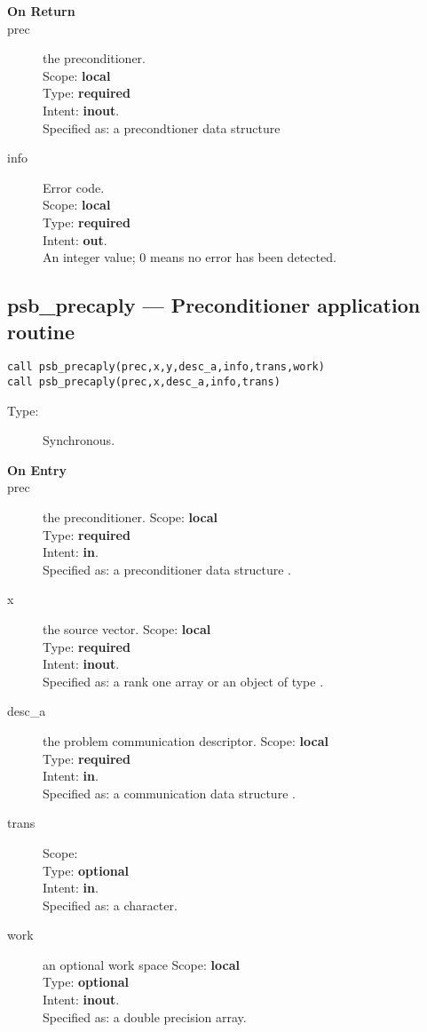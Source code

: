 \begin{description}
\item[\bf On Return]
\item[prec] the preconditioner.\\
Scope: {\bf local} \\
Type: {\bf required}\\
Intent: {\bf inout}.\\
Specified as: a precondtioner data structure \precdata\\
\item[info] Error code.\\
Scope: {\bf local} \\
Type: {\bf required} \\
Intent: {\bf out}.\\
An integer value; 0 means no error has been detected. 
\end{description}



\clearpage\subsection*{psb\_precaply --- Preconditioner application routine}

\begin{verbatim}
call psb_precaply(prec,x,y,desc_a,info,trans,work)
call psb_precaply(prec,x,desc_a,info,trans)
\end{verbatim}

\begin{description}
\item[Type:] Synchronous.
\item[\bf On Entry]
\item[prec] the preconditioner.
Scope: {\bf local} \\
Type: {\bf required}\\
Intent: {\bf in}.\\
Specified as: a preconditioner data structure \precdata.
\item[x] the source vector.
Scope: {\bf local} \\
Type: {\bf required}\\
Intent: {\bf inout}.\\
Specified as:  a rank one array or an object of type \vdata. 
\item[desc\_a] the problem communication descriptor.
Scope: {\bf local} \\
Type: {\bf required}\\
Intent: {\bf in}.\\
Specified as: a communication data structure \descdata.
\item[trans] 
Scope: {\bf } \\
Type: {\bf optional}\\
Intent: {\bf in}.\\
Specified as: a character.
\item[work] an optional work space
Scope: {\bf local} \\
Type: {\bf optional}\\
Intent: {\bf inout}.\\
Specified as: a double precision array.
\end{description}

